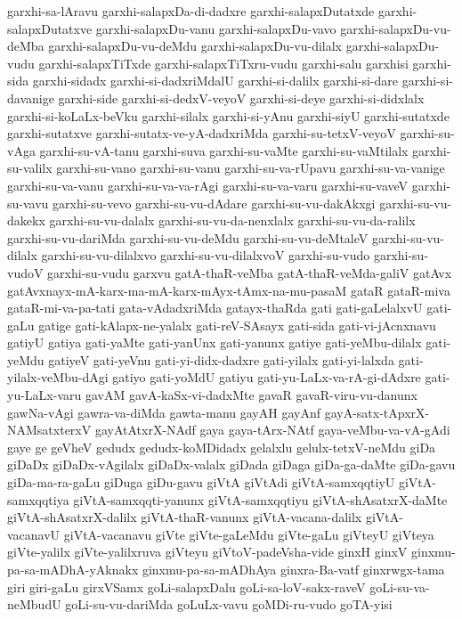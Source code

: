 {garxhi-sa-lAravu
garxhi-salapxDa-di-dadxre
garxhi-salapxDutatxde
garxhi-salapxDutatxve
garxhi-salapxDu-vanu
garxhi-salapxDu-vavo
garxhi-salapxDu-vu-deMba
garxhi-salapxDu-vu-deMdu
garxhi-salapxDu-vu-dilalx
garxhi-salapxDu-vudu
garxhi-salapxTiTxde
garxhi-salapxTiTxru-vudu
garxhi-salu
garxhisi
garxhi-sida
garxhi-sidadx
garxhi-si-dadxriMdalU
garxhi-si-dalilx
garxhi-si-dare
garxhi-si-davanige
garxhi-side
garxhi-si-dedxV-veyoV
garxhi-si-deye
garxhi-si-didxlalx
garxhi-si-koLaLx-beVku
garxhi-silalx
garxhi-si-yAnu
garxhi-siyU
garxhi-sutatxde
garxhi-sutatxve
garxhi-sutatx-ve-yA-dadxriMda
garxhi-su-tetxV-veyoV
garxhi-su-vAga
garxhi-su-vA-tanu
garxhi-suva
garxhi-su-vaMte
garxhi-su-vaMtilalx
garxhi-su-valilx
garxhi-su-vano
garxhi-su-vanu
garxhi-su-va-rUpavu
garxhi-su-va-vanige
garxhi-su-va-vanu
garxhi-su-va-va-rAgi
garxhi-su-va-varu
garxhi-su-vaveV
garxhi-su-vavu
garxhi-su-vevo
garxhi-su-vu-dAdare
garxhi-su-vu-dakAkxgi
garxhi-su-vu-dakekx
garxhi-su-vu-dalalx
garxhi-su-vu-da-nenxlalx
garxhi-su-vu-da-ralilx
garxhi-su-vu-dariMda
garxhi-su-vu-deMdu
garxhi-su-vu-deMtaleV
garxhi-su-vu-dilalx
garxhi-su-vu-dilalxvo
garxhi-su-vu-dilalxvoV
garxhi-su-vudo
garxhi-su-vudoV
garxhi-su-vudu
garxvu
gatA-thaR-veMba
gatA-thaR-veMda-galiV
gatAvx
gatAvxnayx-mA-karx-ma-mA-karx-mAyx-tAmx-na-mu-pasaM
gataR
gataR-miva
gataR-mi-va-pa-tati
gata-vAdadxriMda
gatayx-thaRda
gati
gati-gaLelalxvU
gati-gaLu
gatige
gati-kAlapx-ne-yalalx
gati-reV-SAsayx
gati-sida
gati-vi-jAcnxnavu
gatiyU
gatiya
gati-yaMte
gati-yanUnx
gati-yanunx
gatiye
gati-yeMbu-dilalx
gati-yeMdu
gatiyeV
gati-yeVnu
gati-yi-didx-dadxre
gati-yilalx
gati-yi-lalxda
gati-yilalx-veMbu-dAgi
gatiyo
gati-yoMdU
gatiyu
gati-yu-LaLx-va-rA-gi-dAdxre
gati-yu-LaLx-varu
gavAM
gavA-kaSx-vi-dadxMte
gavaR
gavaR-viru-vu-danunx
gawNa-vAgi
gawra-va-diMda
gawta-manu
gayAH
gayAnf
gayA-satx-tApxrX-NAMsatxterxV
gayAtAtxrX-NAdf
gaya
gaya-tArx-NAtf
gaya-veMbu-va-vA-gAdi
gaye
ge
geVheV
gedudx
gedudx-koMDidadx
gelalxlu
gelulx-tetxV-neMdu
giDa
giDaDx
giDaDx-vAgilalx
giDaDx-valalx
giDada
giDaga
giDa-ga-daMte
giDa-gavu
giDa-ma-ra-gaLu
giDuga
giDu-gavu
giVtA
giVtAdi
giVtA-samxqqtiyU
giVtA-samxqqtiya
giVtA-samxqqti-yanunx
giVtA-samxqqtiyu
giVtA-shAsatxrX-daMte
giVtA-shAsatxrX-dalilx
giVtA-thaR-vanunx
giVtA-vacana-dalilx
giVtA-vacanavU
giVtA-vacanavu
giVte
giVte-gaLeMdu
giVte-gaLu
giVteyU
giVteya
giVte-yalilx
giVte-yalilxruva
giVteyu
giVtoV-padeVsha-vide
ginxH
ginxV
ginxmu-pa-sa-mADhA-yAknakx
ginxmu-pa-sa-mADhAya
ginxra-Ba-vatf
ginxrwgx-tama
giri
giri-gaLu
girxVSamx
goLi-salapxDalu
goLi-sa-loV-sakx-raveV
goLi-su-va-neMbudU
goLi-su-vu-dariMda
goLuLx-vavu
goMDi-ru-vudo
goTA-yisi
}
